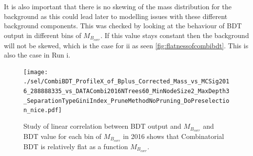 It is also important that there is no skewing of the mass distribution for the background as this could lead later to modelling issues with these different background components. This was checked by looking at the behaviour of BDT output in different bins of $M_{B_{corr}}$. If this value stays constant then the background will not be skewed, which is the case for \Rn{2} as seen \autoref{fig:flatnessofcombibdt}. This is also the case in Run \Rn{1}. 


\begin{figure}[ht]
\centering
	\texttt{[image: ./sel/CombiBDT\_ProfileX\_of\_Bplus\_Corrected\_Mass\_vs\_MCSig2016\_288888335\_vs\_DATACombi2016NTrees60\_MinNodeSize2\_MaxDepth3\_SeparationTypeGiniIndex\_PruneMethodNoPruning\_DoPreselection\_nice.pdf]}
\caption{Study of linear correlation between BDT output and $M_{B_{corr}}$ and BDT value for each bin of $M_{B_{corr}}$ in 2016 shows that Combinatorial BDT is relatively flat as a function $M_{B_{corr}}$.}
\label{fig:flatnessofcombibdt}
\end{figure}




